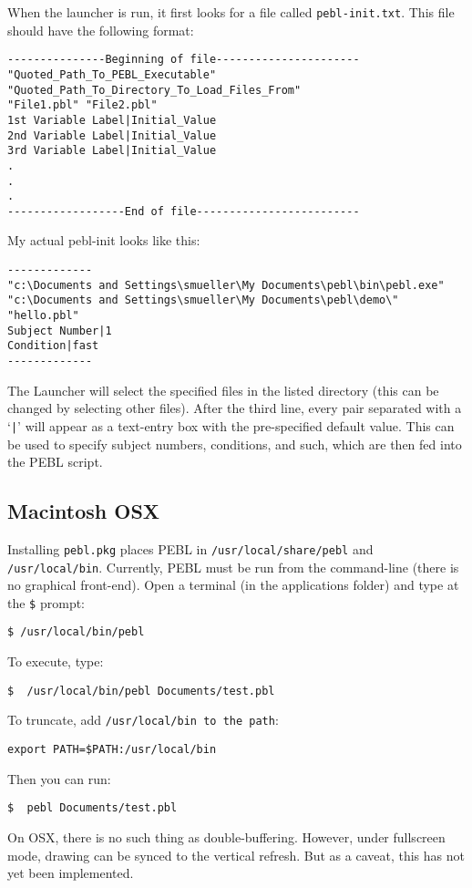 When the launcher is run, it first looks for a file called \texttt{pebl-init.txt}. This file should have the following format:
\begin{verbatim}
---------------Beginning of file----------------------
"Quoted_Path_To_PEBL_Executable"
"Quoted_Path_To_Directory_To_Load_Files_From"
"File1.pbl" "File2.pbl"
1st Variable Label|Initial_Value
2nd Variable Label|Initial_Value
3rd Variable Label|Initial_Value
.
.
.
------------------End of file-------------------------
\end{verbatim}
My actual pebl-init looks like this:
\begin{verbatim}
-------------
"c:\Documents and Settings\smueller\My Documents\pebl\bin\pebl.exe"
"c:\Documents and Settings\smueller\My Documents\pebl\demo\"
"hello.pbl"
Subject Number|1
Condition|fast
-------------
\end{verbatim}

The Launcher will select the specified files in the listed
directory (this can be changed by selecting other files).
After the third line, every pair separated with a `\texttt{|}'  will appear as a text-entry box with the pre-specified default value. This can be used to specify subject numbers, conditions, and such, which are then fed into the PEBL script.

\subsection{ Macintosh OSX}

Installing \texttt{pebl.pkg} places PEBL in
\texttt{/usr/local/share/pebl} and \texttt{/usr/local/bin}.
Currently, PEBL must be run from the command-line (there is no
graphical front-end).  Open a terminal (in the applications folder)
and type at the \texttt{\$} prompt:
\begin{verbatim}
$ /usr/local/bin/pebl
\end{verbatim}
To execute, type:
\begin{verbatim}
$  /usr/local/bin/pebl Documents/test.pbl
\end{verbatim}
To truncate, add \texttt{/usr/local/bin to the path}:
\begin{verbatim}
export PATH=$PATH:/usr/local/bin
\end{verbatim}
Then you can run:
\begin{verbatim}
$  pebl Documents/test.pbl
\end{verbatim}

On OSX, there is no such thing as double-buffering.  
However, under fullscreen mode, drawing can be synced to the vertical refresh. But as a caveat, this has not yet been implemented.

